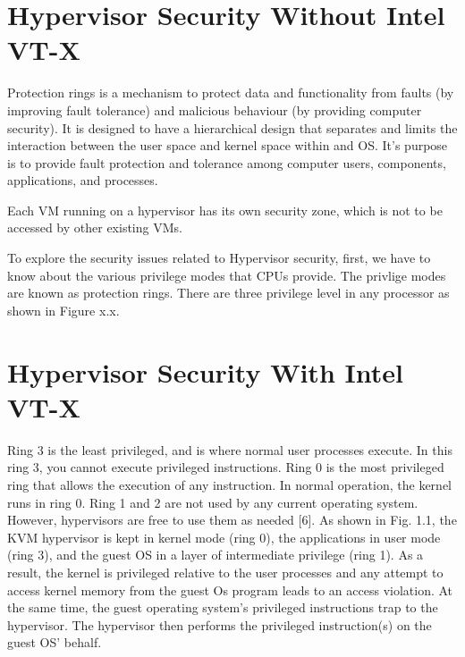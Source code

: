 \documentclass{report}
\begin{document}
\begin{spacing}{1.5}
\section{Hypervisor Security Without Intel VT-X}

{\large
Protection rings is a mechanism to protect data and functionality from faults (by improving fault tolerance) and malicious behaviour (by providing computer security). It is designed to have a hierarchical design that separates and limits the interaction between the user space and kernel space within and OS. It's purpose is to provide fault protection and tolerance among computer users, components, applications, and processes.
\newline
}

Each VM running on a hypervisor has its own security zone, which is not to be accessed by other existing VMs.


To explore the security issues related to Hypervisor security, first, we have to know about the various privilege modes that CPUs provide. The privlige modes are known as protection rings. There are three privilege level in any processor as shown in Figure x.x.


\section{Hypervisor Security With Intel VT-X}


{\large
Ring 3 is the least privileged, and is where normal user processes execute. In this ring 3, you cannot execute privileged instructions. Ring 0 is the most privileged ring that allows the execution of any instruction. In normal operation, the kernel runs in ring 0. Ring 1 and 2 are not used by any current operating system. However, hypervisors are free to use them as needed [6]. As shown in Fig. 1.1, the KVM hypervisor is kept in kernel mode (ring 0), the applications in user mode (ring 3), and the guest OS in a layer of intermediate privilege (ring 1). As a result, the kernel is privileged relative to the user processes and any attempt to access kernel memory from the guest Os program leads to an access violation. At the same time, the guest operating system’s privileged instructions trap to the hypervisor. The hypervisor then performs the privileged instruction(s) on the guest OS' behalf.
\newline
}













\end{spacing}
\end{document}
